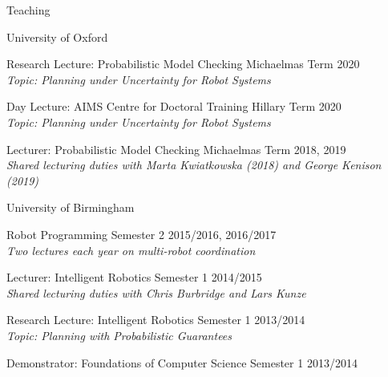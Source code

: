 
\begin{rSection}{Teaching}

\begin{rSubsection}{University of Oxford}{}{}{}
\item Research Lecture: Probabilistic Model Checking   \hfill Michaelmas Term 2020\\
\textit{Topic: Planning under Uncertainty for Robot Systems }
\item Day Lecture: AIMS Centre for Doctoral Training   \hfill Hillary Term 2020\\
\textit{Topic: Planning under Uncertainty for Robot Systems }
\item Lecturer: Probabilistic Model Checking  \hfill Michaelmas Term 2018, 2019\\
\textit{Shared lecturing duties with Marta Kwiatkowska (2018) and George Kenison (2019)}
\end{rSubsection}

\begin{rSubsection}{University of Birmingham}{}{}{}
\item Robot Programming  \hfill Semester 2 2015/2016, 2016/2017\\
\textit{Two lectures each year on multi-robot coordination}
\item Lecturer: Intelligent Robotics \hfill Semester 1 2014/2015\\
\textit{Shared lecturing duties with Chris Burbridge and Lars Kunze}
\item Research Lecture: Intelligent Robotics \hfill Semester 1 2013/2014\\
\textit{Topic: Planning with Probabilistic Guarantees }
\item Demonstrator: Foundations of Computer Science \hfill Semester 1 2013/2014
\end{rSubsection}



\end{rSection}
